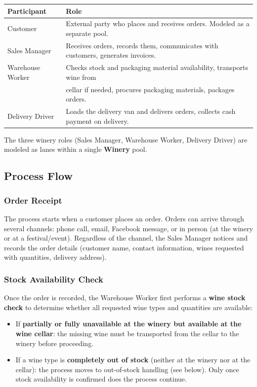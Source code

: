 \documentclass[11pt,a4paper]{article}
\begin{document}
\begin{table}[H]
\centering
\begin{tabular}{@{}ll@{}}
\toprule
\textbf{Participant} & \textbf{Role} \\
\midrule
Customer          & External party who places and receives orders. Modeled as a separate pool. \\
Sales Manager     & Receives orders, records them, communicates with customers, generates invoices. \\
Warehouse Worker  & Checks stock and packaging material availability, transports wine from \\
                  & cellar if needed, procures packaging materials, packages orders. \\
Delivery Driver   & Loads the delivery van and delivers orders, collects cash payment on delivery. \\
\bottomrule
\end{tabular}
\end{table}

The three winery roles (Sales Manager, Warehouse Worker, Delivery Driver) are modeled as lanes within a single \textbf{Winery} pool.

\subsection{Process Flow}

\subsubsection{Order Receipt}

The process starts when a customer places an order. Orders can arrive through several channels: phone call, email, Facebook message, or in person (at the winery or at a festival/event).
Regardless of the channel, the Sales Manager notices and records the order details (customer name, contact information, wines requested with quantities, delivery address).

\subsubsection{Stock Availability Check}

Once the order is recorded, the Warehouse Worker first performs a \textbf{wine stock check} to determine whether all requested wine types and quantities are available:
\begin{itemize}
    \item If \textbf{partially or fully unavailable at the winery but available at the wine cellar}: the missing wine must be transported from the cellar to the winery before proceeding.
    \item If a wine type is \textbf{completely out of stock} (neither at the winery nor at the cellar): the process moves to out-of-stock handling (see below). Only once stock availability is confirmed does the process continue.
\end{itemize}
\end{document}
